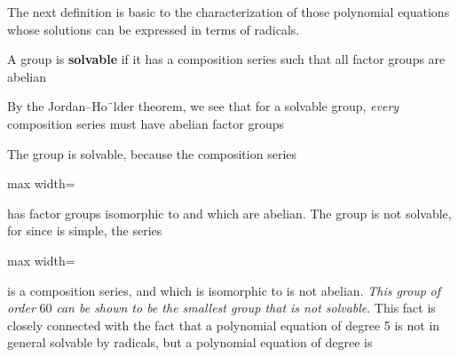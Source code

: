 \documentclass[11pt,oneside]{article}
\begin{document}
\BookNarrativetrue

\begin{BookBody}

The next definition is basic to the characterization of those polynomial equations whose solutions can be expressed in terms of radicals.

 A group  is\textbf{ solvable} if it has a composition series  such that all factor groups  are abelian\BookEnd{\blacksquare}

By the Jordan–Ho¨lder theorem, we see that for a solvable group,\textit{ every} composition series  must have abelian factor groups 

 The group  is solvable, because the composition series

\begin{center}\begin{adjustbox}{max width=\linewidth}\end{adjustbox}\end{center}

\noindent has factor groups isomorphic to  and  which are abelian. The group  is not solvable, for since  is simple, the series

\begin{center}\begin{adjustbox}{max width=\linewidth}\end{adjustbox}\end{center}

\noindent is a composition series, and  which is isomorphic to  is not abelian.\textit{ This group}  \textit{of order} 60\textit{ can be shown to be the smallest group that is not solvable}. This fact is closely connected with the fact that a polynomial equation of degree 5 is not in general solvable by radicals, but a polynomial equation of degree  is\BookEnd{\blacktriangle}



\end{BookBody}
\end{document}
